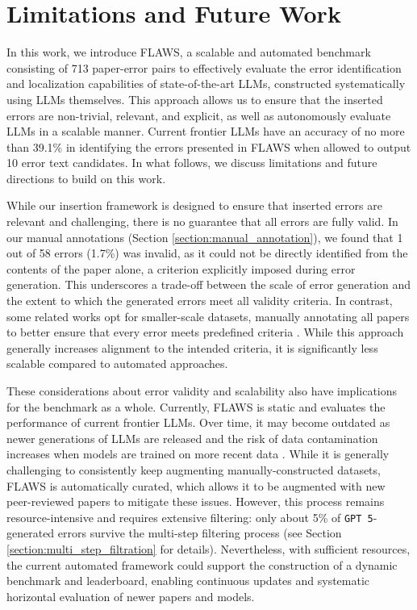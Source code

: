 \documentclass{article}
\newcommand{\gpt}{\texttt{GPT 5}}
\newcommand{\benchmark}{FLAWS}
\begin{document}
\section{Limitations and Future Work}
In this work, we introduce \benchmark{}, a scalable and automated benchmark consisting of 713 paper-error pairs to effectively evaluate the error identification and localization capabilities of state-of-the-art LLMs, constructed systematically using LLMs themselves. This approach allows us to ensure that the inserted errors are non-trivial, relevant, and explicit, as well as autonomously evaluate LLMs in a scalable manner. Current frontier LLMs have an accuracy of no more than 39.1\% in identifying the errors presented in \benchmark{} when allowed to output 10 error text candidates. In what follows, we discuss limitations and future directions to build on this work. 

While our insertion framework is designed to ensure that inserted errors are relevant and challenging, there is no guarantee that all errors are fully valid. In our manual annotations (Section \ref{section:manual_annotation}), we found that 1 out of 58 errors (1.7\%) was invalid, as it could not be directly identified from the contents of the paper alone, a criterion explicitly imposed during error generation. This underscores a trade-off between the scale of error generation and the extent to which the generated errors meet all validity criteria. In contrast, some related works opt for smaller-scale datasets, manually annotating all papers to better ensure that every error meets predefined criteria \citep{liu2023, son2025}. While this approach generally increases alignment to the intended criteria, it is significantly less scalable compared to automated approaches.

These considerations about error validity and scalability also have implications for the benchmark as a whole. Currently, \benchmark{} is static and evaluates the performance of current frontier LLMs. Over time, it may become outdated as newer generations of LLMs are released and the risk of data contamination increases when models are trained on more recent data \citep{deng2024, sainz2023}. While it is generally challenging to consistently keep augmenting manually-constructed datasets, \benchmark{} is automatically curated, which allows it to be augmented with new peer-reviewed papers to mitigate these issues. However, this process remains resource-intensive and requires extensive filtering: only about 5\% of \gpt{}-generated errors survive the multi-step filtering process (see Section \ref{section:multi_step_filtration} for details). Nevertheless, with sufficient resources, the current automated framework could support the construction of a dynamic benchmark and leaderboard, enabling continuous updates and systematic horizontal evaluation of newer papers and models.
\end{document}
